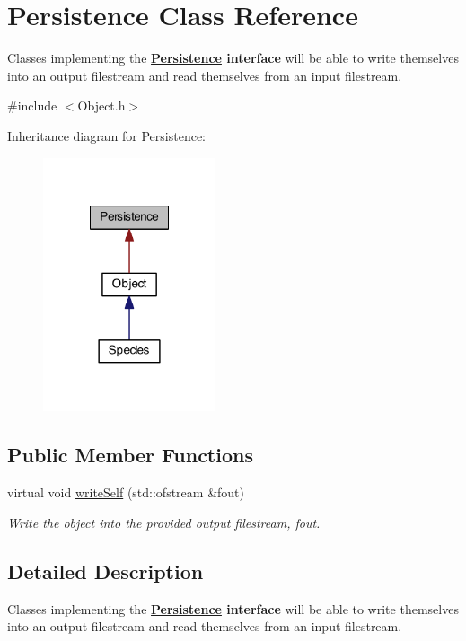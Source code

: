 \hypertarget{classPersistence}{\section{Persistence Class Reference}
\label{classPersistence}
}


Classes implementing the {\bfseries \hyperlink{classPersistence}{Persistence} interface} will be able to write themselves into an output filestream and read themselves from an input filestream.  




{\ttfamily \#include $<$Object.\-h$>$}



Inheritance diagram for Persistence\-:\nopagebreak
\begin{figure}[H]
\begin{center}
\leavevmode
\includegraphics[width=144pt]{classPersistence__inherit__graph}
\end{center}
\end{figure}
\subsection*{Public Member Functions}
\begin{DoxyCompactItemize}
\item 
virtual void \hyperlink{classPersistence_ad83e4a143a2d03f776f8e6fe32236e82}{write\-Self} (std\-::ofstream \&fout)
\begin{DoxyCompactList}\small\item\em Write the object into the provided output filestream, fout. \end{DoxyCompactList}\end{DoxyCompactItemize}


\subsection{Detailed Description}
Classes implementing the {\bfseries \hyperlink{classPersistence}{Persistence} interface} will be able to write themselves into an output filestream and read themselves from an input filestream. 

